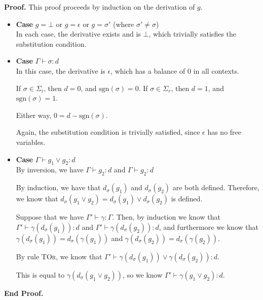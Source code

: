 \documentclass{article}
\newcommand{\judgebalance}[3][\Gamma]{{#1} \vdash {#2} : {#3}}
\newcommand{\judgesubst}[3]{{#1} \vdash {#2} : {#3}}
\newcommand{\deriv}[2]{d_{#1}({#2})}
\newenvironment{proof}{\noindent\textbf{Proof.}}{\noindent\textbf{End Proof.}}
\newenvironment{caseblock}{\begin{itemize}}{\end{itemize}}
\newenvironment{case}[1]{\item \textbf{Case} {#1}\\}{}
\begin{document}
\begin{proof}
  This proof proceeds by induction on the derivation of $g$. 

  \begin{caseblock}
    \begin{case}{$g = \bot$ or $g = \epsilon$ or $g = \sigma'$ (where $\sigma' \not= \sigma$)}
      In each case, the derivative exists and is $\bot$, which trivially satisfies the 
      substitution condition. 
    \end{case}

    \begin{case}{$\judgebalance{\sigma}{d}$}
      In this case, the derivative is $\epsilon$, which has a balance of 0 in all 
      contexts. 

      If $\sigma \in \Sigma_i$, then $d = 0$, and $\mathrm{sgn}(\sigma) = 0$. 
      If $\sigma \in \Sigma_r$, then $d = 1$, and $\mathrm{sgn}(\sigma) = 1$. 

      Either way, $0 = d - \mathrm{sgn}(\sigma)$. 

      Again, the substitution condition is trivially satisfied, since $\epsilon$ has
      no free variables. 
    \end{case}

    \begin{case}{$\judgebalance{g_1 \vee g_2}{d}$}
      By inversion, we have $\judgebalance{g_2}{d}$ and $\judgebalance{g_2}{d}$
      
      By induction, we have that $\deriv{\sigma}{g_1}$ and $\deriv{\sigma}{g_2}$ are
      both defined. Therefore, we know that $\deriv{\sigma}{g_1 \vee g_2} = \deriv{\sigma}{g_1} \vee 
      \deriv{\sigma}{g_2}$ is defined.

      Suppose that we have $\judgesubst{\Gamma'}{\gamma}{\Gamma}$. Then, by 
      induction we know that $\judgebalance[\Gamma']{\gamma(\deriv{\sigma}{g_1})}{d}$ and 
      $\judgebalance[\Gamma']{\gamma(\deriv{\sigma}{g_2})}{d}$, and furthermore 
      we know that $\gamma(\deriv{\sigma}{g_1}) = \deriv{\sigma}{\gamma(g_1)}$ and 
      $\gamma(\deriv{\sigma}{g_2}) = \deriv{\sigma}{\gamma(g_2)}$. 

      By rule \textsc{TOr}, we know that $\judgebalance[\Gamma']{\gamma(\deriv{\sigma}{g_1}) \vee \gamma(\deriv{\sigma}{g_2})}{d}$. 

      This is equal to $\gamma(\deriv{\sigma}{g_1 \vee g_2})$, so we
      know $\judgebalance[\Gamma']{\gamma(g_1 \vee g_2)}{d}$.


\end{case}
\end{caseblock}
\end{proof}
\end{document}
